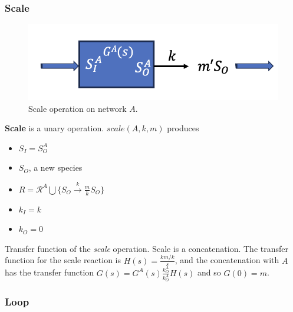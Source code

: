 \documentclass[unnumsec,webpdf,contemporary,large]{oup-authoring-template}%
\theoremstyle{thmstyleone}%
\theoremstyle{thmstyletwo}%
\theoremstyle{thmstylethree}%
\begin{document}
\subsubsection{Scale}
\begin{figure}
         \centering
         \includegraphics[scale=0.4]{figures/scale.png}
          \caption[]{Scale operation on network $A$.}
         \label{fig:scale}
\end{figure}
{\bf Scale} is a unary operation.
$scale(A, k, m)$ produces 
\begin{itemize}
\item $S_I = S^A_O$
\item $S_O$, a new species
\item $R = \mathcal{R}^A \bigcup \{S_O \xrightarrow{k} \frac{m}{k} S_O\}$
\item $k_I = k$
\item $k_O = 0$
\end{itemize}

Transfer function of the {\em scale} operation.
Scale is a concatenation.
The transfer function for the scale reaction is
$H(s) = \frac{km/k } {s}$, and the concatenation with $A$
has the transfer function
$G(s) = G^A(s) \frac{k^A_O}{k^A_O} H(s)$ and so
$G(0) = m$.


\subsubsection{Loop}
\end{document}
